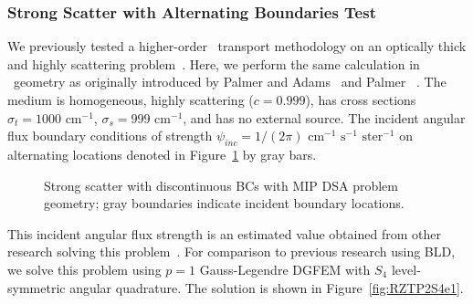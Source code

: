 \documentclass[12pt,letterpaper]{article}
\begin{document}
\subsubsection{Strong Scatter with Alternating Boundaries Test}
\label{sec:RZStrongScatter}
We previously tested a higher-order \XY\ transport methodology on an optically thick and highly scattering problem~\cite{WoodsHoDgfemXyCurved}. Here, we perform the same calculation in \RZ\ geometry as originally introduced by Palmer and Adams~\cite{PalmerCurvilinearTransport} and Palmer~
\cite{PalmerDissertation}. The medium is homogeneous, highly scattering ($c=0.999$), has cross sections $\sigma_t=1000 \text{ cm}^{-1}$, $\sigma_s = 999 \text{ cm}^{-1}$, and has no external source. The incident angular flux boundary conditions of strength $\psi_{inc} = 1/(2 \pi) \text{ cm}^{-1} \text{ s}^{-1} \text{ ster}^{-1}$ on alternating locations denoted in Figure~\ref{fig:StrongScatterProblem} by gray bars.
%
\begin{figure}[!htb]
\centering
{}
\caption{Strong scatter with discontinuous BCs with MIP DSA problem geometry; gray boundaries indicate incident boundary locations.}
\label{fig:StrongScatterProblem}
\end{figure}
%
This incident angular flux strength is an estimated value obtained from other research solving this problem~\cite{PalmerCurvilinearTransport,PalmerDissertation}. For comparison to previous research using BLD, we solve this problem using $p=1$ Gauss-Legendre DGFEM with $S_4$ level-symmetric angular quadrature. The solution is shown in Figure~\ref{fig:RZTP2S4e1}.
\end{document}
